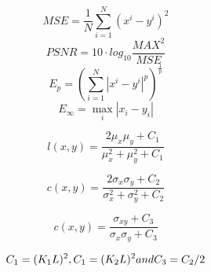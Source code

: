 \begin{equation}
MSE= \frac{1}{N} \sum_{i=1}^N{(x^i-y^i)^2}
\end{equation}
\begin{equation}
PSNR= 10 \cdot log_{10}\frac{MAX^2}{MSE}
\end{equation}
\begin{equation}
E_p = ( \sum_{i=1}^N{|x^i-y^i|^p})^{\frac{1}{p}}
\end{equation}
\begin{equation}
E_\infty = \max_i{|x_i-y_i|}
\end{equation}

\begin{equation}
l(x, y) = \frac{2\mu_x \mu_y + C_1}{\mu_x^2 + \mu_y^2 + C_1}
\end{equation}

\begin{equation}
c(x, y) = \frac{2\sigma_x \sigma_y + C_2}{\sigma_x^2 + \sigma_y^2 + C_2}
\end{equation}

\begin{equation}
c(x, y) = \frac{\sigma_{xy} + C_3}{\sigma_x \sigma_y + C_3}
\end{equation}

\begin{equation}
C_1 = (K_1 L)^2, C_1 = (K_2 L)^2 \space and \space C_3 = C_2/2
\end{equation}